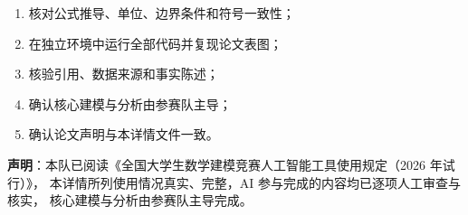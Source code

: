 \documentclass[12pt,a4paper]{ctexart}
\begin{document}
\begin{enumerate}[label=\arabic*), leftmargin=2.2em, itemsep=0.3em]
  \item 核对公式推导、单位、边界条件和符号一致性；
  \item 在独立环境中运行全部代码并复现论文表图；
  \item 核验引用、数据来源和事实陈述；
  \item 确认核心建模与分析由参赛队主导；
  \item 确认论文声明与本详情文件一致。
\end{enumerate}

\vspace{1em}
\noindent
\textbf{声明}：本队已阅读《全国大学生数学建模竞赛人工智能工具使用规定（2026 年试行）》，
本详情所列使用情况真实、完整，AI 参与完成的内容均已逐项人工审查与核实，
核心建模与分析由参赛队主导完成。
\end{document}
